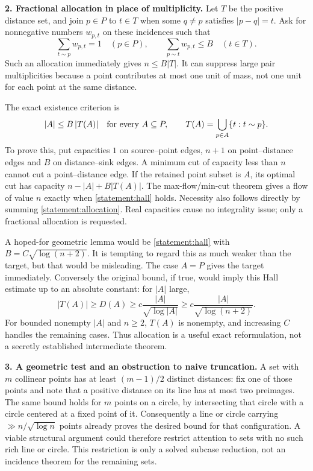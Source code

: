 \documentclass[11pt,a4paper]{article}
\numberwithin{equation}{section}
\begin{document}
\textbf{2. Fractional allocation in place of multiplicity.}
Let $T$ be the positive distance set, and join $p\in P$ to $t\in T$
when some $q\ne p$ satisfies $|p-q|=t$. Ask for nonnegative numbers
$w_{p,t}$ on these incidences such that
\begin{equation}\label{statement:allocation}
 \sum_{t\sim p}w_{p,t}=1\quad(p\in P),\qquad
 \sum_{p\sim t}w_{p,t}\le B\quad(t\in T).
\end{equation}
Such an allocation immediately gives $n\le B|T|$. It can suppress large
pair multiplicities because a point contributes at most one unit of mass,
not one unit for each point at the same distance.

The exact existence criterion is
\begin{equation}\label{statement:hall}
 |A|\le B\,|T(A)|\quad\hbox{for every }A\subseteq P,
 \qquad T(A)=\bigcup_{p\in A}\{t:t\sim p\}.
\end{equation}
To prove this, put capacities $1$ on source--point edges, $n+1$ on
point--distance edges and $B$ on distance--sink edges. A minimum cut of
capacity less than $n$ cannot cut a point--distance edge. If the retained
point subset is $A$, its optimal cut has capacity
$n-|A|+B|T(A)|$. The max-flow/min-cut theorem gives a flow of value $n$
exactly when \eqref{statement:hall} holds. Necessity also follows directly by
summing \eqref{statement:allocation}. Real capacities cause no integrality
issue; only a fractional allocation is requested.

A hoped-for geometric lemma would be \eqref{statement:hall} with
$B=C\sqrt{\log(n+2)}$. It is tempting to regard this as much weaker than
the target, but that would be misleading. The case $A=P$ gives the target
immediately. Conversely the original bound, if true, would imply this
Hall estimate up to an absolute constant: for $|A|$ large,
\[
 |T(A)|\ge D(A)\ge c\frac{|A|}{\sqrt{\log |A|}}
            \ge c\frac{|A|}{\sqrt{\log(n+2)}}.
\]
For bounded nonempty $|A|$ and $n\ge2$, $T(A)$ is nonempty, and increasing
$C$ handles the remaining cases. Thus allocation is a useful exact
reformulation, not a secretly established intermediate theorem.

\textbf{3. A geometric test and an obstruction to naive truncation.}
A set with $m$ collinear points has at least $(m-1)/2$ distinct distances:
fix one of those points and note that a positive distance on its line has
at most two preimages. The same bound holds for $m$ points on a circle,
by intersecting that circle with a circle centered at a fixed point of it.
Consequently a line or circle carrying
$\gg n/\sqrt{\log n}$ points already proves the desired bound for that
configuration. A viable structural argument could therefore restrict
attention to sets with no such rich line or circle. This restriction is
only a solved subcase reduction, not an incidence theorem for the
remaining sets.
\end{document}
